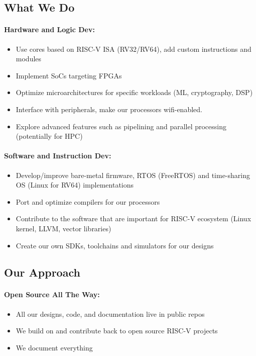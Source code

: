 \documentclass{article}
\begin{document}
\subsection{What We Do}

\paragraph{Hardware and Logic Dev:}

\begin{itemize}
    \item Use cores based on RISC-V ISA (RV32/RV64), add custom instructions and modules
    \item Implement SoCs targeting FPGAs
    \item Optimize microarchitectures for specific workloads (ML, cryptography, DSP)
    \item Interface with peripherals, make our processors wifi-enabled.
    \item Explore advanced features such as pipelining and parallel processing (potentially for HPC)
\end{itemize}
\paragraph{Software and Instruction Dev:}

\begin{itemize}
    \item Develop/improve bare-metal firmware, RTOS (FreeRTOS) and time-sharing OS (Linux for RV64) implementations
    \item Port and optimize compilers for our processors
    \item Contribute to the software that are important for RISC-V ecosystem (Linux kernel, LLVM, vector libraries)
    \item Create our own SDKs, toolchains and simulators for our designs
\end{itemize}

\subsection{Our Approach}

\paragraph{Open Source All The Way:}

\begin{itemize}
    \item All our designs, code, and documentation live in public repos
    \item We build on and contribute back to open source RISC-V projects
    \item We document everything
\end{itemize}
\end{document}
